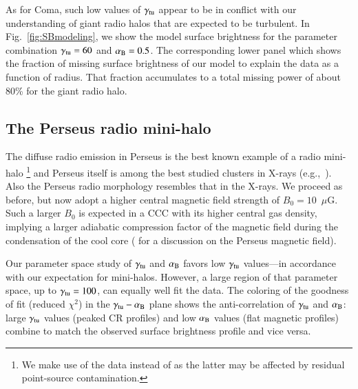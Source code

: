 \documentclass[useAMS,usenatbib]{mn2e}
\begin{document}
As for Coma, such low values of $\gamma_{{\mathrm{tu}}}$ appear to be in conflict
with our understanding of giant radio halos that are expected to be
turbulent. In Fig.~\ref{fig:SBmodeling}, we show the model surface brightness
for the parameter combination $\gamma_{{\mathrm{tu}}} = 60$ and
$\alpha_{{\mathrm{B}}}=0.5$. The corresponding lower panel which shows the fraction
of missing surface brightness of our model to explain the data as a function of
radius. That fraction accumulates to a total missing power of about 80\% for the
giant radio halo.


\subsection{The Perseus radio mini-halo}

The diffuse radio emission in Perseus is the best known example of a radio
mini-halo \citep{1990MNRAS.246..477P}\footnote{We make use of the
  \citet{1990MNRAS.246..477P} data instead of \citet{Sijbring1993} as the latter
  may be affected by residual point-source contamination.}  and Perseus itself
is among the best studied clusters in X-rays
(e.g.,~\citealp{2003ApJ...590..225C,2006MNRAS.366..417F,2011arXiv1105.5025F}). Also
the Perseus radio morphology resembles that in the X-rays. We proceed as before,
but now adopt a higher central magnetic field strength of
$B_{0}=10$~$\mu$G. Such a larger $B_0$ is expected in a CCC with its higher
central gas density, implying a larger adiabatic compression factor of the
magnetic field during the condensation of the cool core
(\citealp{2010ApJ...710..634A,2011arXiv1111.5544M} for a discussion on the
Perseus magnetic field).

Our parameter space study of $\gamma_{{\mathrm{tu}}}$ and $\alpha_{{\mathrm{B}}}$ favors
low $\gamma_{{\mathrm{tu}}}$ values---in accordance with our expectation for
mini-halos. However, a large region of that parameter space, up to
$\gamma_{{\mathrm{tu}}} = 100$, can equally well fit the data. The coloring of the
goodness of fit (reduced $\chi^2$) in the $\gamma_{{\mathrm{tu}}}-\alpha_{{\mathrm{B}}}$
plane shows the anti-correlation of $\gamma_{{\mathrm{tu}}}$ and $\alpha_{{\mathrm{B}}}$:
large $\gamma_{{\mathrm{tu}}}$ values (peaked CR profiles) and low $\alpha_{{\mathrm{B}}}$
values (flat magnetic profiles) combine to match the observed surface brightness
profile and vice versa.
\end{document}

